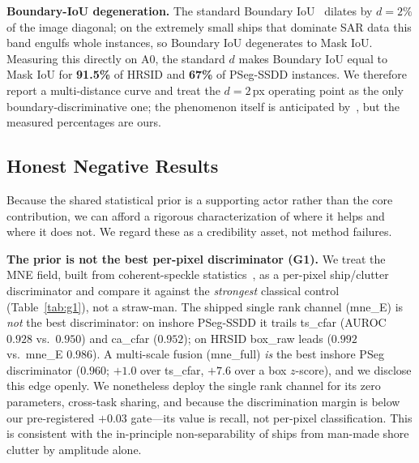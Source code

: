 \documentclass[journal]{IEEEtran}
\begin{document}
\textbf{Boundary-IoU degeneration.} The standard Boundary IoU~\cite{cheng2021boundary} dilates by $d=2\%$ of the image diagonal; on the extremely small ships that dominate SAR data this band engulfs whole instances, so Boundary IoU degenerates to Mask IoU. Measuring this directly on A0, the standard $d$ makes Boundary IoU equal to Mask IoU for \textbf{91.5\%} of HRSID and \textbf{67\%} of PSeg-SSDD instances. We therefore report a multi-distance curve and treat the $d=2$\,px operating point as the only boundary-discriminative one; the phenomenon itself is anticipated by~\cite{cheng2021boundary}, but the measured percentages are ours.

\subsection{Honest Negative Results}
\label{ssec:negatives}
Because the shared statistical prior is a supporting actor rather than the core contribution, we can afford a rigorous characterization of where it helps and where it does not. We regard these as a credibility asset, not method failures.

\textbf{The prior is not the best per-pixel discriminator (G1).} We treat the MNE field, built from coherent-speckle statistics~\cite{goodman1976speckle}, as a per-pixel ship/clutter discriminator and compare it against the \emph{strongest} classical control (Table~\ref{tab:g1}), not a straw-man. The shipped single rank channel (mne\_E) is \emph{not} the best discriminator: on inshore PSeg-SSDD it trails ts\_cfar (AUROC $0.928$ vs.\ $0.950$) and ca\_cfar ($0.952$); on HRSID box\_raw leads ($0.992$ vs.\ mne\_E $0.986$). A multi-scale fusion (mne\_full) \emph{is} the best inshore PSeg discriminator ($0.960$; $+1.0$ over ts\_cfar, $+7.6$ over a box $z$-score), and we disclose this edge openly. We nonetheless deploy the single rank channel for its zero parameters, cross-task sharing, and because the discrimination margin is below our pre-registered $+0.03$ gate---its value is recall, not per-pixel classification. This is consistent with the in-principle non-separability of ships from man-made shore clutter by amplitude alone.
\end{document}
